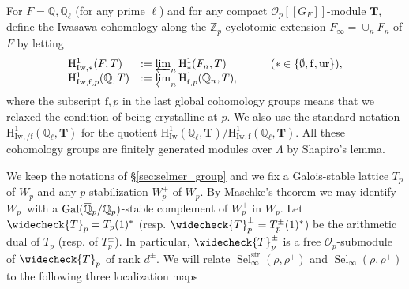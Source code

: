 \documentclass[12pt]{amsart}
\newcommand\bQ{\mathbb{Q}}
\newcommand\Zp{{\mathbb{Z}_p}}
\newcommand\Qp{{\mathbb{Q}_p}}
\newcommand\cO{\mathcal{O}}
\newcommand{\ob}[1]{\mkern 1.5mu\overline{\mkern-1.5mu#1\mkern-1.5mu}\mkern 1.5mu}
\newcommand{\str}{\mathrm{str}}
\DeclareMathOperator{\Gal}{Gal}
\DeclareMathOperator{\Sel}{Sel}
\newcommand{\HH}{\mathrm{H}}
\newcommand{\ff}{\mathrm{f}}
\newcommand{\Iw}{\mathrm{Iw}}
\newcommand{\ur}{\mathrm{ur}}
\theoremstyle{defstyle}
\theoremstyle{thmstyle}
\begin{document}
For $F=\bQ,\bQ_\ell$ (for any prime $\ell$) and for any compact $\cO_p[[G_F]]$-module $\textbf{T}$, define the Iwasawa cohomology along the $\Zp$-cyclotomic extension $F_\infty=\cup_n F_n$ of $F$ by letting
\[\begin{array}{ll}
\HH^1_{\Iw,*}(F,\textbf{T})&:= \varprojlim_n \HH^1_*(F_n,\textbf{T}) \qquad \qquad (*\in\{\emptyset,\ff,\ur\}), \\
\HH^1_{\Iw,\ff,p}(\bQ,\textbf{T})&:= \varprojlim_n \HH^1_{\ff,p}(\bQ_n,\textbf{T}),
\end{array}\]
where the subscript $\ff,p$ in the last global cohomology groups means that we relaxed the condition of being crystalline at $p$. We also use the standard notation $\HH^1_{\Iw,/\ff}(\bQ_\ell,\textbf{T})$ for the quotient $\HH^1_\Iw(\bQ_\ell,\textbf{T})/\HH^1_{\Iw,\ff}(\bQ_\ell,\textbf{T})$. All these cohomology groups are finitely generated modules over $\Lambda$ by Shapiro's lemma. 

We keep the notations of \S\ref{sec:selmer_group} and we fix a Galois-stable lattice $T_p$ of $W_p$ and any $p$-stabilization $W_p^+$ of $W_p$. By Maschke's theorem we may identify $W_p^-$ with a $\Gal(\ob{\bQ}_p/\Qp)$-stable complement of $W_p^+$ in $W_p$. Let $\widecheck{T}_p=T_p(1)^*$ (resp. $\widecheck{T}_p^\pm=T_p^\pm(1)^*$) be the arithmetic dual of $T_p$ (resp. of $T_p^\pm$). In particular, $\widecheck{T}_p^\pm$ is a free $\cO_p$-submodule of $\widecheck{T}_p$ of rank $d^\pm$. We will relate $\Sel^\str_\infty(\rho,\rho^+)$ and $\Sel_\infty(\rho,\rho^+)$ to the following three localization maps
\end{document}
